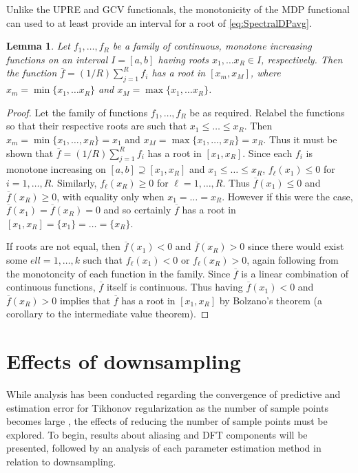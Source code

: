 \documentclass[12pt]{article}
\newtheorem{lemma}{Lemma}[section]
\begin{document}
Unlike the UPRE and GCV functionals, the monotonicity of the MDP functional can used to at least provide an interval for a root of \eqref{eq:SpectralDPavg}. 
\begin{lemma}
Let $f_1,\ldots,f_R$ be a family of continuous, monotone increasing functions on an interval $I = [a,b]$ having roots $x_1,\ldots x_R \in I$, respectively. Then the function $\overline{f} = (1/R)\sum_{j=1}^R f_i$ has a root in $[x_m,x_M]$, where $x_m = \min\{x_1,\ldots x_R\}$ and $x_M = \max\{x_1,\ldots x_R\}$.
\end{lemma}
\begin{proof}
Let the family of functions $f_1,\ldots,f_R$ be as required. Relabel the functions so that their respective roots are such that $x_1 \leq \ldots \leq x_R$. Then $x_m = \min\{x_1,\ldots,x_R\} = x_1$ and $x_M = \max\{x_1,\ldots,x_R\} = x_R$. Thus it must be shown that $\overline{f} = (1/R)\sum_{j=1}^R f_i$ has a root in $[x_1,x_R]$. Since each $f_i$ is monotone increasing on $[a,b] \supseteq [x_1,x_R]$ and $x_1 \leq \ldots \leq x_R$, $f_\ell(x_1) \leq 0$ for $i = 1,\ldots,R$. Similarly, $f_\ell(x_R) \geq 0$ for $\ell = 1,\ldots,R$. Thus $\overline{f}(x_1) \leq 0$ and $\overline{f}(x_R) \geq 0$, with equality only when $x_1 = \ldots = x_R$. However if this were the case, $\overline{f}(x_1) = \overline{f}(x_R) = 0$ and so certainly $\overline{f}$ has a root in $[x_1,x_R] = \{x_1\} = \ldots = \{x_R\}$. \par 
If roots are not equal, then $\overline{f}(x_1) < 0$ and $\overline{f}(x_R) > 0$ since there would exist some $ell = 1,\ldots,k$ such that $f_\ell(x_1) < 0$ or $f_\ell(x_R) > 0$, again following from the monotoncity of each function in the family. Since $\overline{f}$ is a linear combination of continuous functions, $\overline{f}$ itself is continuous. Thus having $\overline{f}(x_1) < 0$ and $\overline{f}(x_R) > 0$ implies that $\overline{f}$ has a root in $[x_1,x_R]$ by Bolzano's theorem (a corollary to the intermediate value theorem).
\end{proof}

\section{Effects of downsampling} \label{sec:Effects of downsampling}
While analysis has been conducted regarding the convergence of predictive and estimation error for Tikhonov regularization as the number of sample points becomes large \cite{Vogel:2002}, the effects of reducing the number of sample points must be explored. To begin, results about aliasing and DFT components will be presented, followed by an analysis of each parameter estimation method in relation to downsampling. 
\end{document}
